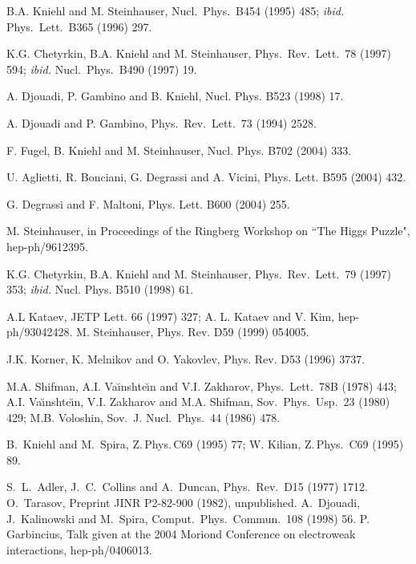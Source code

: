 \begin{thebibliography}{999}
 B.A. Kniehl and M. Steinhauser, Nucl.\ Phys.\ B454 (1995) 485;
{\it ibid.}  Phys.\ Lett.\ B365 (1996) 297.

 K.G. Chetyrkin, B.A. Kniehl and M. Steinhauser,
Phys.\ Rev.\ Lett.\ 78 (1997) 594; {\it ibid.} Nucl.\ Phys.\ B490 (1997) 19.

 A. Djouadi, P. Gambino and B. Kniehl, Nucl. Phys. B523 (1998) 
17.

 A. Djouadi and P. Gambino, Phys.\ Rev.\ Lett.\ 73 (1994) 2528.

 F. Fugel, B. Kniehl and M. Steinhauser, 
Nucl. Phys. B702 (2004) 333. 

 U. Aglietti, R. Bonciani, G. Degrassi and A. Vicini, 
Phys. Lett. B595 (2004) 432. 

 G. Degrassi and F. Maltoni, Phys. Lett. B600 (2004) 255.

%
 M. Steinhauser, in Proceedings of the Ringberg Workshop on
``The Higgs Puzzle", hep-ph/9612395. 

 K.G. Chetyrkin, B.A. Kniehl and M. Steinhauser,
Phys.\ Rev.\ Lett.\ 79 (1997) 353; {\it ibid.} Nucl. Phys. B510 (1998) 61. 

 A.L Kataev, JETP Lett. 66 (1997) 327;
A. L. Kataev and V. Kim, hep-ph/93042428. 
%
 M. Steinhauser, Phys. Rev. D59 (1999) 054005. 

 J.K. Korner, K. Melnikov and O. Yakovlev, 
Phys. Rev. D53 (1996) 3737. 

 M.A. Shifman, A.I.  Va\u\i nshte\u\i n and V.I. Zakharov,
Phys.\ Lett.\ 78B (1978) 443; A.I. Va\u\i nshte\u\i n, V.I. Zakharov and M.A. 
Shifman, Sov.\ Phys.\ Usp.\ 23 (1980) 429; M.B. Voloshin,
Sov.\ J. Nucl.\ Phys.\ 44 (1986) 478.

 B.\ Kniehl and M.\ Spira, Z.\,Phys.\,C69 (1995) 77;
W. Kilian, Z.\,Phys.\ C69 (1995) 89.

 S.~L.~Adler, J.~C.~Collins and A.~Duncan, Phys.~Rev.~D15
(1977) 1712.
%
 O.~Tarasov, Preprint JINR P2-82-900 (1982), unpublished.
%
%
A.~Djouadi, J.~Kalinowski and M.~Spira, Comput.\ Phys.\ Commun.\ 108 (1998) 56.
%
%
 P. Garbincius, Talk given at the 2004 Moriond 
Conference on electroweak interactions, hep-ph/0406013. 


\end{thebibliography}
